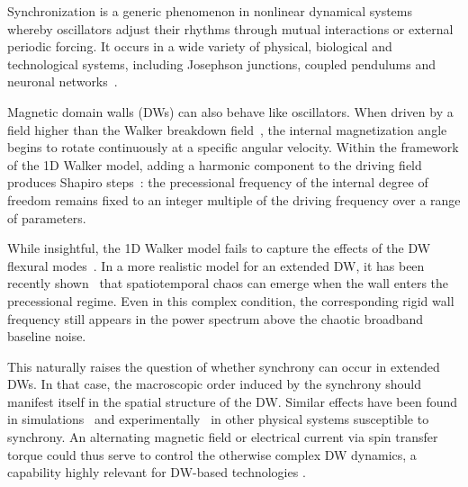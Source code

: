 \documentclass[prb,aps,twocolumn,superscriptaddress,floatfix]{revtex4-1}
\begin{document}
Synchronization is a generic phenomenon in nonlinear dynamical systems whereby oscillators adjust their rhythms through mutual interactions or external periodic forcing. It occurs in a wide variety of physical, biological and technological systems, including Josephson junctions, coupled pendulums and neuronal networks~\cite{Strogatz2015,Pikovsky_Rosenblum_Kurths_2001}.

Magnetic domain walls (DWs) can also behave like oscillators. When driven by a field higher than the Walker breakdown field~\cite{Schryer1974}, the internal magnetization angle begins to rotate continuously at a specific angular velocity. Within the framework of the 1D Walker model, adding a harmonic component to the driving field produces Shapiro steps~\cite{shapiro1963josephson,berger1991prediction,kim2019}: the precessional frequency of the internal degree of freedom remains fixed to an integer multiple of the driving frequency over a range of parameters.

While insightful, the 1D Walker model fails to capture the effects of the DW flexural modes~\cite{thevenard2011domain,gourdon2013domain,Kim2024}.
In a more realistic model for an extended DW, it has been recently shown~\cite{pusiol2026deterministic} that spatiotemporal chaos can emerge when the wall enters the precessional regime. Even in this complex condition, the corresponding rigid wall frequency still appears in the power spectrum above the chaotic broadband baseline noise.

This naturally raises the question of whether synchrony can occur in extended DWs. In that case, the macroscopic order induced by the synchrony should manifest itself in the spatial structure of the DW. Similar effects have been found in simulations~\cite{koltonmodelocking,koltonmodelocking2} and experimentally~\cite{okumasuppresion} in other physical systems susceptible to synchrony. An alternating magnetic field or electrical current via spin transfer torque could thus serve to control the otherwise complex DW dynamics, a capability highly relevant for DW-based technologies \cite{Parkin2008,kim2019,Moon_2017,Munsu2021}.
\end{document}

